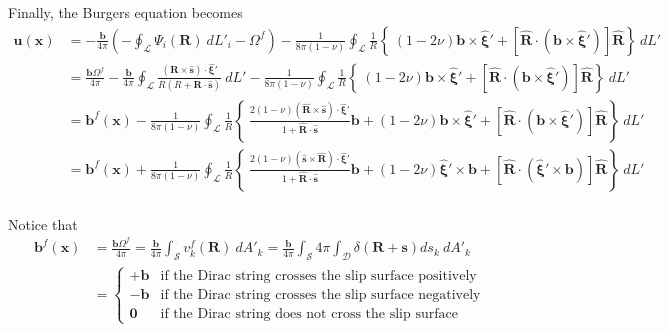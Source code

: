 Finally, the Burgers equation becomes \[ \begin{align} \mathbf{u}(\mathbf x) &=-\frac{\mathbf{ b}}{4\pi}\left(-\oint_\mathcal{L}\Psi_i(\mathbf{R})\ dL'_i-\Omega^f\right)-\frac{1}{8\pi(1-\nu)}\oint_\mathcal{L}\frac{1}{R}\left\{\ \left(1-2\nu\right) \mathbf{ b}\times\hat{\mathbf{ \xi}}' + \left[\hat{\mathbf{ R}}\cdot\left(\mathbf{ b}\times\hat{\mathbf{ \xi}}' \right) \right]\hat{\mathbf{ R}} \right\}\ dL'\nonumber\\ &=\frac{\mathbf{ b}\Omega^f}{4\pi} -\frac{\mathbf{ b}}{4\pi}\oint_\mathcal{L}\frac{(\mathbf{R}\times\hat{\mathbf{s}})\cdot\hat{\mathbf{\xi}}'}{R\left(R+\mathbf{R}\cdot\hat{\mathbf{s}}\right)}\ dL' -\frac{1}{8\pi(1-\nu)}\oint_\mathcal{L}\frac{1}{R}\left\{\ \left(1-2\nu\right) \mathbf{ b}\times\hat{\mathbf{ \xi}}' + \left[\hat{\mathbf{ R}}\cdot\left(\mathbf{ b}\times\hat{\mathbf{ \xi}}' \right) \right]\hat{\mathbf{ R}} \right\}\ dL'\nonumber\\ &=\mathbf{b}^f(\mathbf x) -\frac{1}{8\pi(1-\nu)}\oint_\mathcal{L} \frac{1}{R}\left\{\ \frac{2(1-\nu)(\hat{\mathbf{R}}\times\hat{\mathbf{s}})\cdot\hat{\mathbf{\xi}}'}{1+\hat{\mathbf{R}}\cdot\hat{\mathbf{s}}}\mathbf{ b} + \left(1-2\nu\right) \mathbf{ b}\times\hat{\mathbf{ \xi}}' + \left[\hat{\mathbf{ R}}\cdot\left(\mathbf{ b}\times\hat{\mathbf{ \xi}}' \right) \right]\hat{\mathbf{ R}} \right\}\ dL'\nonumber\\ &=\mathbf{b}^f(\mathbf x) +\frac{1}{8\pi(1-\nu)}\oint_\mathcal{L} \frac{1}{R}\left\{\ \frac{2(1-\nu)(\hat{\mathbf{s}}\times\hat{\mathbf{R}})\cdot\hat{\mathbf{\xi}}'}{1+\hat{\mathbf{R}}\cdot\hat{\mathbf{s}}}\mathbf{ b} + \left(1-2\nu\right) \hat{\mathbf{ \xi}}'\times \mathbf{ b} + \left[\hat{\mathbf{ R}}\cdot\left(\hat{\mathbf{ \xi}}'\times\mathbf{ b} \right) \right]\hat{\mathbf{ R}} \right\}\ dL'\nonumber\\ \end{align} \]

Notice that \[ \begin{align} \mathbf{b}^f(\mathbf x) &=\frac{\mathbf{ b}\Omega^f}{4\pi} =\frac{\mathbf{ b}}{4\pi}\int_\mathcal{S} v^f_k(\mathbf{R})\ dA'_k =\frac{\mathbf{ b}}{4\pi}\int_\mathcal{S} 4\pi\int_\mathcal{D}\delta(\mathbf{R}+\mathbf{s})ds_k\ dA'_k\nonumber\\ &=\begin{cases} +\mathbf{b}&\mbox{if the Dirac string crosses the slip surface positively}\\ -\mathbf{b}&\mbox{if the Dirac string crosses the slip surface negatively}\\ \mathbf{0}&\mbox{if the Dirac string does not cross the slip surface } \end{cases} \end{align} \]

